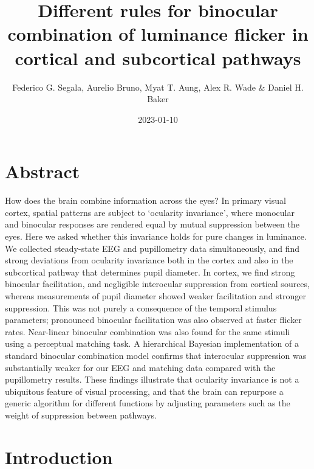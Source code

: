 \documentclass[
]{article}
\title{Different rules for binocular combination of luminance flicker in cortical and subcortical pathways}
\author{Federico G. Segala, Aurelio Bruno, Myat T. Aung, Alex R. Wade \& Daniel H. Baker}
\date{2023-01-10}
\begin{document}
\maketitle

\hypertarget{abstract}{%
\section{Abstract}\label{abstract}}

How does the brain combine information across the eyes? In primary visual cortex, spatial patterns are subject to `ocularity invariance', where monocular and binocular responses are rendered equal by mutual suppression between the eyes. Here we asked whether this invariance holds for pure changes in luminance. We collected steady-state EEG and pupillometry data simultaneously, and find strong deviations from ocularity invariance both in the cortex and also in the subcortical pathway that determines pupil diameter. In cortex, we find strong binocular facilitation, and negligible interocular suppression from cortical sources, whereas measurements of pupil diameter showed weaker facilitation and stronger suppression. This was not purely a consequence of the temporal stimulus parameters; pronounced binocular facilitation was also observed at faster flicker rates. Near-linear binocular combination was also found for the same stimuli using a perceptual matching task. A hierarchical Bayesian implementation of a standard binocular combination model confirms that interocular suppression was substantially weaker for our EEG and matching data compared with the pupillometry results. These findings illustrate that ocularity invariance is not a ubiquitous feature of visual processing, and that the brain can repurpose a generic algorithm for different functions by adjusting parameters such as the weight of suppression between pathways.

\hypertarget{introduction}{%
\section{Introduction}\label{introduction}}
\end{document}
